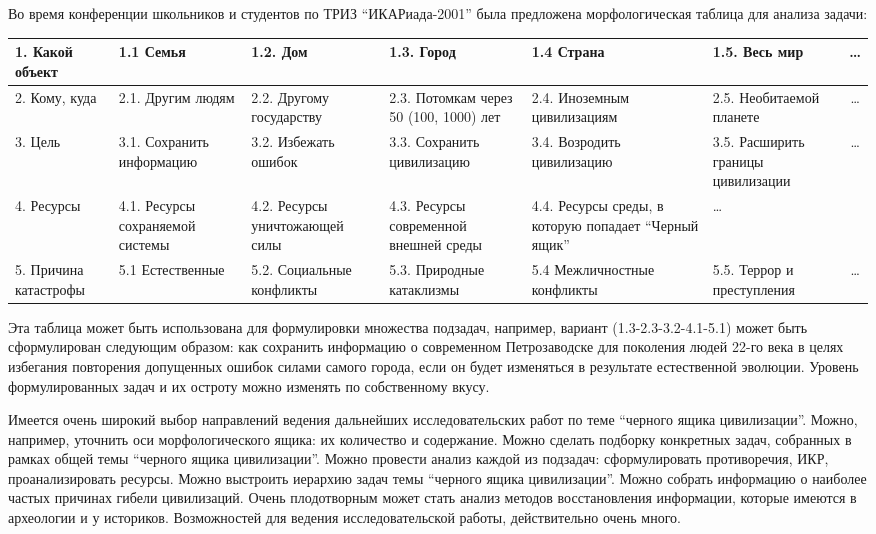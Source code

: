 \documentclass[11pt,a4paper]{article}
\begin{document}
Во время конференции школьников и студентов по ТРИЗ “ИКАРиада-2001” была
предложена морфологическая таблица для анализа задачи:

\begin{center}\small
  \begin{tabular}{|*{6}{>{\raggedright}p{1.9cm}|}c|}\hline
1. Какой объект & 1.1 Семья & 1.2. Дом & 1.3. Город & 1.4 Страна & 1.5. Весь
мир & \ldots \\\hline
2. Кому, куда & 2.1. Другим людям & 2.2. Другому государству & 2.3. Потомкам
через 50 (100, 1000) лет & 2.4. Иноземным цивилизациям & 2.5. Необитаемой
планете & \ldots \\\hline
3. Цель & 3.1. Сохранить информацию & 3.2. Избежать ошибок & 3.3. Сохранить
цивилизацию & 3.4. Возродить цивилизацию & 3.5. Расширить границы цивилизации
& \ldots \\\hline
4. Ресурсы & 4.1. Ресурсы сохраняемой системы & 4.2. Ресурсы уничтожающей силы
& 4.3. Ресурсы современной внешней среды & 4.4. Ресурсы среды, в которую
попадает “Черный ящик” & \ldots & \\\hline 
5. Причина катастрофы & 5.1 Естественные & 5.2. Социальные конфликты &
5.3. Природные катаклизмы & 5.4 Межличностные конфликты & 5.5. Террор и
преступления & \ldots \\\hline
  \end{tabular}
\end{center}
Эта таблица может быть использована для формулировки множества подзадач,
например, вариант (1.3-2.3-3.2-4.1-5.1) может быть сформулирован следующим
образом: как сохранить информацию о современном Петрозаводске для поколения
людей 22-го века в целях избегания повторения допущенных ошибок силами самого
города, если он будет изменяться в результате естественной эволюции. Уровень
формулированных задач и их остроту можно изменять по собственному вкусу.

Имеется очень широкий выбор направлений ведения дальнейших исследовательских
работ по теме “черного ящика цивилизации”. Можно, например, уточнить оси
морфологического ящика: их количество и содержание. Можно сделать подборку
конкретных задач, собранных в рамках общей темы “черного ящика
цивилизации”. Можно провести анализ каждой из подзадач: сформулировать
противоречия, ИКР, проанализировать ресурсы. Можно выстроить иерархию задач
темы “черного ящика цивилизации”. Можно собрать информацию о наиболее частых
причинах гибели цивилизаций. Очень плодотворным может стать анализ методов
восстановления информации, которые имеются в археологии и у
историков. Возможностей для ведения исследовательской работы, действительно
очень много.
\end{document}
